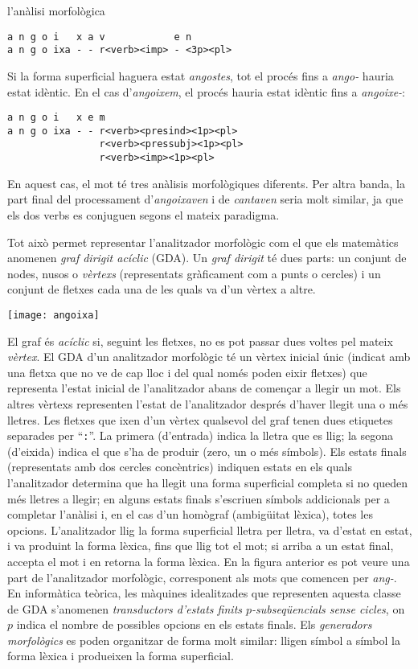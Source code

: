 \begin{persabermes}{l'anàlisi morfològica}
\begin{verbatim}
a n g o i   x a v            e n
a n g o ixa - - r<verb><imp> - <3p><pl>
\end{verbatim}
Si la forma superficial haguera estat \emph{angostes}, tot el procés
fins a \emph{ango-} hauria estat idèntic. En el cas d'{\em angoixem},
el procés hauria estat idèntic fins a {\em angoixe-}:
\begin{verbatim}
a n g o i   x e m
a n g o ixa - - r<verb><presind><1p><pl>
                r<verb><pressubj><1p><pl>
                r<verb><imp><1p><pl> 
\end{verbatim}
En aquest cas, el mot té tres anàlisis morfològiques diferents.  Per
altra banda, la part final del processament d'\emph{angoixaven} i de
\emph{cantaven} seria molt similar, ja que els dos verbs es conjuguen
segons el mateix paradigma.

Tot això permet representar l'analitzador morfològic com el que els
matemàtics anomenen \emph{graf dirigit acíclic} (GDA). Un \emph{graf
  dirigit} té dues parts: un conjunt de nodes, nusos o \emph{vèrtexs}
(representats gràficament com a punts o cercles) i un conjunt de
fletxes cada una de les quals va d'un vèrtex a altre.

\texttt{[image: angoixa]}

El graf és \emph{acíclic} si, seguint les fletxes, no es pot passar
dues voltes pel mateix \emph{vèrtex}. El GDA d'un analitzador
morfològic té un vèrtex inicial únic (indicat amb una fletxa que no ve
de cap lloc i del qual només poden eixir fletxes) que representa
l'estat inicial de l'analitzador abans de començar a llegir un
mot. Els altres vèrtexs representen l'estat de l'analitzador després
d'haver llegit una o més lletres. Les fletxes que ixen d'un vèrtex
qualsevol del graf tenen dues etiquetes separades per ``{\tt :}''. La
primera (d'entrada) indica la lletra que es llig; la segona (d'eixida)
indica el que s'ha de produir (zero, un o més símbols). Els estats
finals (representats amb dos cercles concèntrics) indiquen estats en
els quals l'analitzador determina que ha llegit una forma superficial
completa si no queden més lletres a llegir; en alguns estats finals
s'escriuen símbols addicionals per a completar l'anàlisi i, en el cas
d'un homògraf (ambigüitat lèxica), totes les opcions. L'analitzador
llig la forma superficial lletra per lletra, va d'estat en estat, i va
produint la forma lèxica, fins que llig tot el mot; si arriba a un
estat final, accepta el mot i en retorna la forma lèxica. En la figura
anterior es pot veure una part de l'analitzador morfològic,
corresponent als mots que comencen per \emph{ang-}. En informàtica
teòrica, les màquines idealitzades que representen aquesta classe de
GDA s'anomenen \emph{transductors d'estats finits $p$-subseqüencials
  sense cicles}, on $p$ indica el nombre de possibles opcions en els
estats finals. Els \emph{generadors morfològics} es poden organitzar
de forma molt similar: lligen símbol a símbol la forma lèxica i
produeixen la forma superficial.
\end{persabermes}

